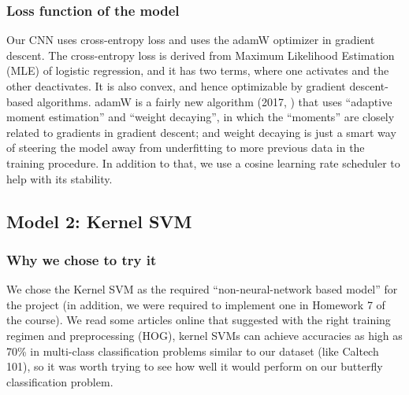 \documentclass[10pt]{article} %
\begin{document}
\subsubsection{Loss function of the model}
Our CNN uses cross-entropy loss and uses the adamW optimizer in gradient descent. The cross-entropy loss is derived from Maximum Likelihood Estimation (MLE) of logistic regression, and it has two terms, where one activates and the other deactivates. It is also convex, and hence optimizable by gradient descent-based algorithms. adamW is a fairly new algorithm (2017, \cite{loshchilov2019decoupledweightdecayregularization}) that uses ``adaptive moment estimation'' and ``weight decaying'', in which the ``moments'' are closely related to gradients in gradient descent; and weight decaying is just a smart way of steering the model away from underfitting to more previous data in the training procedure. In addition to that, we use a cosine learning rate scheduler to help with its stability.
\subsection{Model 2: Kernel SVM}
\subsubsection{Why we chose to try it}
We chose the Kernel SVM as the required ``non-neural-network based model'' for the  project (in addition, we were required to implement one in Homework 7 of the course). We read some articles online that suggested with the right training regimen and preprocessing (HOG), kernel SVMs can achieve accuracies as high as 70\% in multi-class classification problems similar to our dataset (like Caltech 101)\cite{svmacc}, so it was worth trying to see how well it would perform on our butterfly classification problem.
\end{document}
